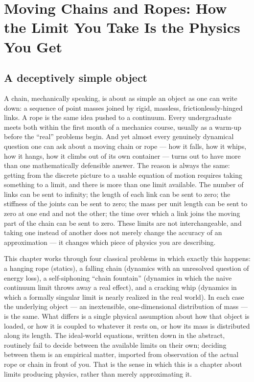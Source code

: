 \documentclass[11pt]{book}
\begin{document}
\chapter[Moving Chains and Ropes]{Moving Chains and Ropes: How the Limit You Take Is the Physics You Get}
\label{chap:chains}

\section{A deceptively simple object}

A chain, mechanically speaking, is about as simple an object as one can write down: a sequence of point masses joined by rigid, massless, frictionlessly-hinged links. A rope is the same idea pushed to a continuum. Every undergraduate meets both within the first month of a mechanics course, usually as a warm-up before the ``real'' problems begin. And yet almost every genuinely dynamical question one can ask about a moving chain or rope --- how it falls, how it whips, how it hangs, how it climbs out of its own container --- turns out to have more than one mathematically defensible answer. The reason is always the same: getting from the discrete picture to a usable equation of motion requires taking something to a limit, and there is more than one limit available. The number of links can be sent to infinity; the length of each link can be sent to zero; the stiffness of the joints can be sent to zero; the mass per unit length can be sent to zero at one end and not the other; the time over which a link joins the moving part of the chain can be sent to zero. These limits are not interchangeable, and taking one instead of another does not merely change the accuracy of an approximation --- it changes which piece of physics you are describing.

This chapter works through four classical problems in which exactly this happens: a hanging rope (statics), a falling chain (dynamics with an unresolved question of energy loss), a self-siphoning ``chain fountain'' (dynamics in which the naive continuum limit throws away a real effect), and a cracking whip (dynamics in which a formally singular limit is nearly realized in the real world). In each case the underlying object --- an inextensible, one-dimensional distribution of mass --- is the same. What differs is a single physical assumption about how that object is loaded, or how it is coupled to whatever it rests on, or how its mass is distributed along its length. The ideal-world equations, written down in the abstract, routinely fail to decide between the available limits on their own; deciding between them is an empirical matter, imported from observation of the actual rope or chain in front of you. That is the sense in which this is a chapter about limits producing physics, rather than merely approximating it.
\end{document}
